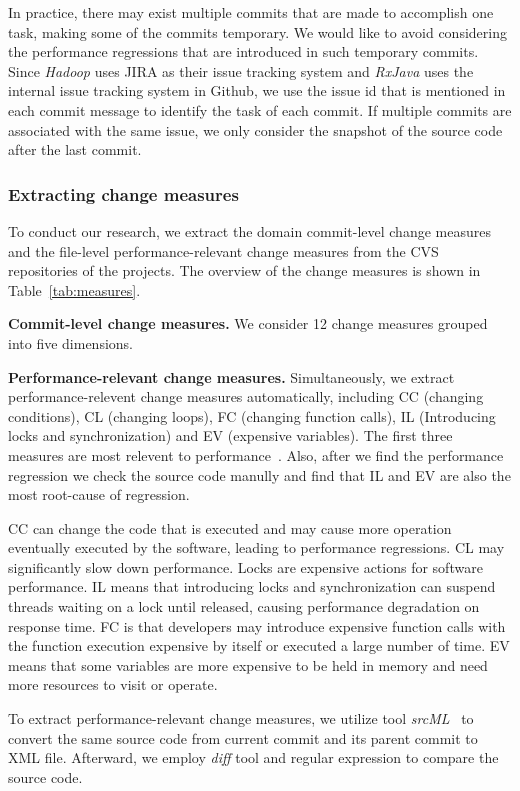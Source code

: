 In practice, there may exist multiple commits that are made to accomplish one task, making some of the commits temporary. We would like to avoid considering the performance regressions that are introduced in such temporary commits. Since \emph{Hadoop} uses JIRA as their issue tracking system and \emph{RxJava} uses the internal issue tracking system in Github, we use the issue id that is mentioned in each commit message to identify the task of each commit. If multiple commits are associated with the same issue, we only consider the snapshot of the source code after the last commit. 
\subsubsection{Extracting change measures}
To conduct our research, we extract the domain commit-level change measures and the file-level performance-relevant change measures from the CVS repositories of the projects. The overview of the change measures is shown in Table~\ref{tab:measures}. 

\textbf{Commit-level change measures.} We consider 12 change measures grouped into five dimensions.

\textbf{Performance-relevant change measures.} Simultaneously, we extract performance-relevent change measures automatically, including CC (changing conditions), CL (changing loops), FC (changing function calls), IL (Introducing locks and synchronization) and EV (expensive variables). The first three measures are most relevent to performance~\cite{ACM2016:Luo}. Also, after we find the performance regression we check the source code manully and find that IL and EV are also the most root-cause of regression. 

CC can change the code that is executed and may cause more operation eventually executed by the software, leading to performance regressions. CL may significantly slow down performance. Locks are expensive actions for software performance. IL means that introducing locks and synchronization can suspend threads waiting on a lock until released, causing performance degradation on response time. FC is that developers may introduce expensive function calls with the function execution expensive by itself or executed a large number of time. EV means that some variables are more expensive to be held in memory and need more resources to visit or operate. 

To extract performance-relevant change measures, we utilize tool \emph{srcML}~\cite{srcml_2017} to convert the same source code from current commit and its parent commit to XML file. Afterward, we employ \emph{diff} tool and regular expression to compare the source code.

